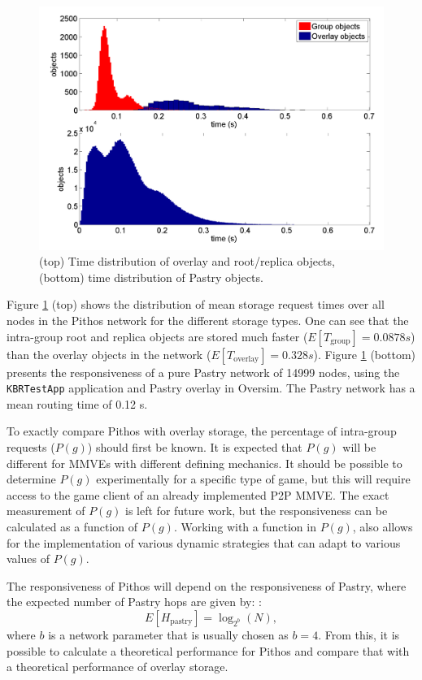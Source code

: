 \documentclass[10pt,a4paper,conference]{IEEEtran}
\begin{document}
\begin{figure}[htbp]
 \centering
 \includegraphics[clip=true, viewport=1cm 0.5cm 29cm 20.5cm, width=\columnwidth]{StoreTimes}
 \caption{(top) Time distribution of overlay and root/replica objects, (bottom) time distribution of Pastry objects.}
 \label{fig_pithos_response}
\end{figure}
%
Figure \ref{fig_pithos_response} (top) shows the distribution of mean storage request times over all nodes in the Pithos network for the different
storage types. One can see that the intra-group root and replica objects are stored much faster ($E\left[T_{\textrm{group}}\right] = 0.0878 s$) than
the overlay objects in the network ($E\left[T_{\textrm{overlay}}\right] = 0.328 s$). Figure \ref{fig_pithos_response} (bottom) presents the
responsiveness of a pure Pastry network of 14999 nodes, using the \verb.KBRTestApp. application and Pastry overlay in Oversim. The Pastry network has
a mean routing time of 0.12 s.

To exactly compare Pithos with overlay storage, the percentage of intra-group requests ($P(g)$) should first be known. It is expected that $P(g)$
will be different for MMVEs with different defining mechanics. It should be possible to determine $P(g)$ experimentally for a specific type of game,
but this will require access to the game client of an already implemented P2P MMVE. The exact measurement of $P(g)$ is left for future work, but the
responsiveness can be calculated as a function of $P(g)$. Working with a function in $P(g)$, also allows for the implementation of various dynamic
strategies that can adapt to various values of $P(g)$.

The responsiveness of Pithos will depend on the responsiveness of Pastry, where the expected number of Pastry hops are given by:
\cite{storage_and_chaching_PAST}:
%
\begin{equation}\label{pastry_hops}
    E[H_{\textrm{pastry}}] = \log_{2^b}\left(N\right),
\end{equation}
%
where $b$ is a network parameter that is usually chosen as $b = 4$. From this, it is possible to calculate a theoretical performance for Pithos and
compare that with a theoretical performance of overlay storage.
\end{document}
